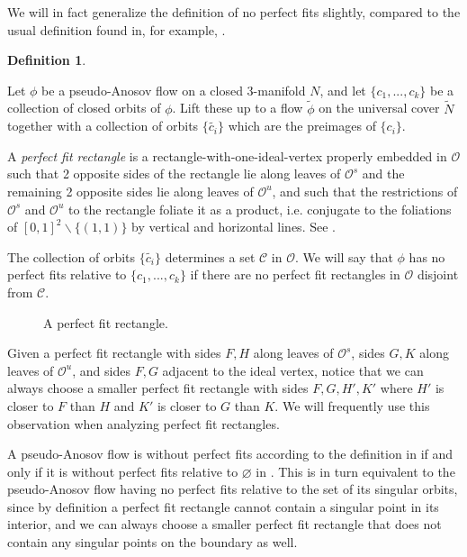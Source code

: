 \documentclass[12pt]{amsart}
\theoremstyle{definition}
\newtheorem{defn}[thm]{Definition}
\numberwithin{equation}{section}
\begin{document}
We will in fact generalize the definition of no perfect fits slightly, compared to the usual definition found in, for example, \cite{Fen12}.

\begin{defn} \label{defn:perfectfit}

Let $\phi$ be a pseudo-Anosov flow on a closed 3-manifold $N$, and let $\{c_1,...,c_k\}$ be a collection of closed orbits of $\phi$. Lift these up to a flow $\widetilde{\phi}$ on the universal cover $\widetilde{N}$ together with a collection of orbits $\{ \widetilde{c_i} \}$ which are the preimages of $\{c_i\}$.

A \textit{perfect fit rectangle} is a rectangle-with-one-ideal-vertex properly embedded in $\mathcal{O}$ such that 2 opposite sides of the rectangle lie along leaves of $\mathcal{O}^s$ and the remaining 2 opposite sides lie along leaves of $\mathcal{O}^u$, and such that the restrictions of $\mathcal{O}^s$ and $\mathcal{O}^u$ to the rectangle foliate it as a product, i.e. conjugate to the foliations of $[0,1]^2 \backslash \{(1,1)\}$ by vertical and horizontal lines. See . 

The collection of orbits $\{ \widetilde{c_i} \}$ determines a set $\mathcal{C}$ in $\mathcal{O}$. We will say that $\phi$ has no perfect fits relative to $\{c_1,...,c_k \}$ if there are no perfect fit rectangles in $\mathcal{O}$ disjoint from $\mathcal{C}$.

\end{defn}

\begin{figure}
    \centering
    \fontsize{18pt}{18pt}\selectfont
    \resizebox{!}{4cm}{}
    \caption{A perfect fit rectangle.}
    \label{fig:perfectfitdefn}
\end{figure}

Given a perfect fit rectangle with sides $F,H$ along leaves of $\mathcal{O}^s$, sides $G,K$ along leaves of $\mathcal{O}^u$, and sides $F,G$ adjacent to the ideal vertex, notice that we can always choose a smaller perfect fit rectangle with sides $F,G,H',K'$ where $H'$ is closer to $F$ than $H$ and $K'$ is closer to $G$ than $K$. We will frequently use this observation when analyzing perfect fit rectangles.

A pseudo-Anosov flow is without perfect fits according to the definition in \cite{Fen12} if and only if it is without perfect fits relative to $\varnothing$ in . This is in turn equivalent to the pseudo-Anosov flow having no perfect fits relative to the set of its singular orbits, since by definition a perfect fit rectangle cannot contain a singular point in its interior, and we can always choose a smaller perfect fit rectangle that does not contain any singular points on the boundary as well.
\end{document}
